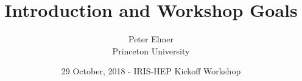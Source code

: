 \documentclass{beamer}
\title{Introduction and Workshop Goals}
\author{Peter Elmer \\ Princeton University}
\date{29 October, 2018 - IRIS-HEP Kickoff Workshop}
\begin{document}
\begin{frame}
  \titlepage
\end{frame}




%
%
%
%
%
%
%
%
%
%
%
%
%
%



\end{document}
